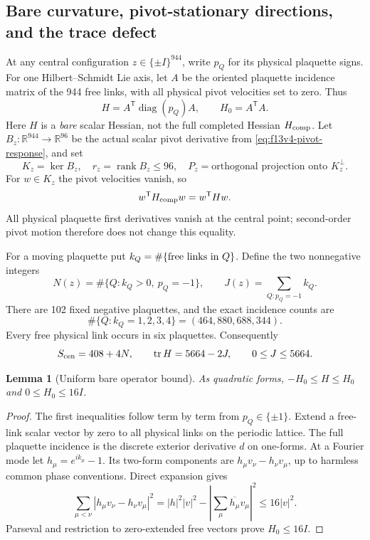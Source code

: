 \documentclass[11pt,oneside]{article}
\newtheorem{lemma}[theorem]{Lemma}
\begin{document}
\subsection{Bare curvature, pivot-stationary directions, and the trace defect}

At any central configuration \(z\in\{\pm I\}^{944}\),
write \(p_Q\) for its physical plaquette signs.
For one Hilbert--Schmidt Lie axis, let \(A\) be the
oriented plaquette incidence matrix of the 944 free
links, with all physical pivot velocities set to zero.
Thus
\[
 H=A^{\mathsf T}\operatorname{diag}(p_Q)A,\qquad
 H_0=A^{\mathsf T}A .
\]
Here \(H\) is a \emph{bare} scalar Hessian, not the
full completed Hessian \(H_{\rm comp}\).
Let \(B_z:\mathbb R^{944}\to\mathbb R^{96}\) be the
actual scalar pivot derivative from
\eqref{eq:f13v4-pivot-response}, and set
\[
 K_z=\ker B_z,\quad r_z=\operatorname{rank}B_z\le96,
 \quad P_z=\text{orthogonal projection onto }K_z^\perp .
\]
For \(w\in K_z\) the pivot velocities vanish, so
\begin{equation}\label{eq:f13v5-restriction}
 w^{\mathsf T}H_{\rm comp}w=w^{\mathsf T}Hw .
\end{equation}
All physical plaquette first derivatives vanish at
the central point; second-order pivot motion therefore
does not change this equality.

For a moving plaquette put \(k_Q=\#\{\hbox{free links in }Q\}\).
Define the two nonnegative integers
\[
 N(z)=\#\{Q:k_Q>0,\ p_Q=-1\},\qquad
 J(z)=\sum_{Q:p_Q=-1}k_Q .
\]
There are 102 fixed negative plaquettes, and the exact
incidence counts are
\begin{equation}\label{eq:f13v5-counts}
 \#\{Q:k_Q=1,2,3,4\}=(464,880,688,344).
\end{equation}
Every free physical link occurs in six plaquettes.
Consequently
\begin{equation}\label{eq:f13v5-trace}
 S_{\rm cen}=408+4N,\qquad
 \operatorname{tr}H=5664-2J,\qquad
 0\le J\le5664 .
\end{equation}

\begin{lemma}[Uniform bare operator bound]
\label{lem:f13v5-norm}
As quadratic forms, \(-H_0\le H\le H_0\) and
\(0\le H_0\le16I\).
\end{lemma}

\begin{proof}
The first inequalities follow term by term from
\(p_Q\in\{\pm1\}\). Extend a free-link scalar vector
by zero to all physical links on the periodic lattice.
The full plaquette incidence is the discrete exterior
derivative \(d\) on one-forms. At a Fourier mode let
\(h_\mu=e^{ik_\mu}-1\). Its two-form components are
\(h_\mu v_\nu-h_\nu v_\mu\), up to harmless common
phase conventions. Direct expansion gives
\[
 \sum_{\mu<\nu}|h_\mu v_\nu-h_\nu v_\mu|^2
 =|h|^2|v|^2-\left|\sum_\mu\overline{h_\mu}v_\mu\right|^2
 \le16|v|^2 .
\]
Parseval and restriction to zero-extended free vectors
prove \(H_0\le16I\).
\end{proof}
\end{document}
